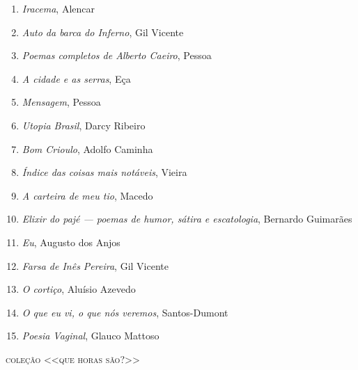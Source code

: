 \begin{enumerate}
\item \textit{Iracema}, Alencar
\item \textit{Auto da barca do Inferno}, Gil Vicente
\item \textit{Poemas completos de Alberto Caeiro}, Pessoa
\item \textit{A cidade e as serras}, Eça
\item \textit{Mensagem}, Pessoa
\item \textit{Utopia Brasil}, Darcy Ribeiro
\item \textit{Bom Crioulo}, Adolfo Caminha
\item \textit{Índice das coisas mais notáveis}, Vieira
\item \textit{A carteira de meu tio}, Macedo
\item \textit{Elixir do pajé --- poemas de humor, sátira e escatologia}, Bernardo Guimarães
\item \textit{Eu}, Augusto dos Anjos
\item \textit{Farsa de Inês Pereira}, Gil Vicente
\item \textit{O cortiço}, Aluísio Azevedo
\item \textit{O que eu vi, o que nós veremos}, Santos-Dumont
\item \textit{Poesia Vaginal}, Glauco Mattoso 
\end{enumerate}

\medskip
{\large\textsc{coleção <<que horas são?>>}}

